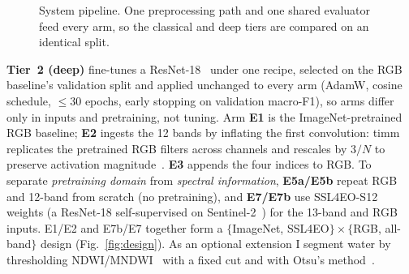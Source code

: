 \documentclass[11pt,a4paper]{article}
\begin{document}
\begin{figure}[ht]
\centering
{}
\caption{System pipeline. One preprocessing path and one shared evaluator feed
every arm, so the classical and deep tiers are compared on an identical split.}
\label{fig:pipeline}
\end{figure}

\textbf{Tier~2 (deep)} fine-tunes a ResNet-18~\cite{he2016} under one recipe,
selected on the RGB baseline's validation split and applied unchanged to every
arm (AdamW, cosine schedule, $\le 30$ epochs, early stopping on validation
macro-F1), so arms differ only in inputs and pretraining, not tuning. Arm
\textbf{E1} is the ImageNet-pretrained RGB baseline; \textbf{E2} ingests the 12
bands by inflating the first convolution: timm replicates the pretrained RGB
filters across channels and rescales by $3/N$ to preserve activation
magnitude~\cite{carreira2017,wightman2019}. \textbf{E3} appends the four indices
to RGB. To separate \emph{pretraining domain} from \emph{spectral information},
\textbf{E5a/E5b} repeat RGB and 12-band from scratch (no pretraining), and
\textbf{E7/E7b} use SSL4EO-S12 weights (a ResNet-18 self-supervised on
Sentinel-2~\cite{wang2023,stewart2022}) for the 13-band and RGB inputs. E1/E2 and
E7b/E7 together form a $\{$ImageNet, SSL4EO$\}\times\{$RGB, all-band$\}$ design
(Fig.~\ref{fig:design}). As an optional extension I segment water by thresholding
NDWI/MNDWI~\cite{xu2006} with a fixed cut and with Otsu's method~\cite{otsu1979}.
\end{document}
